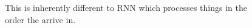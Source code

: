 \documentclass[11pt]{article}
\begin{document}
\begin{figure}[H]
    \centering
    \caption*{This is inherently different to RNN which processes things in the order the arrive in.}
\end{figure}
\end{document}
